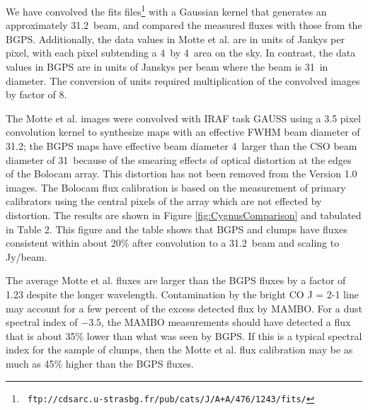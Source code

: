 \documentclass[12pt,preprint]{aastex}
\newcommand{\bcamfwhm}{31.2\arcsec}
\begin{document}
We have convolved the \citet{motte07} fits files\footnote{{\tt
ftp://cdsarc.u-strasbg.fr/pub/cats/J/A+A/476/1243/fits/}} with a Gaussian
kernel that generates an approximately \bcamfwhm\ beam, and compared the
measured fluxes with those from the BGPS.  Additionally, the data values
in Motte et al. are in units of Jankys per pixel, with each pixel subtending
a 4\arcsec\ by 4\arcsec\ area on the sky.  In contrast, the data values
in BGPS are in units of Janskys per beam where the beam is 31\arcsec\
in diameter.   The conversion of units required multiplication of the
convolved images by factor of 8.

The Motte et al. images were convolved with IRAF task
GAUSS using a 3.5 pixel convolution kernel to synthesize maps with an
effective FWHM beam diameter of \bcamfwhm ;  the BGPS maps have effective
beam diameter 4\arcsec\ larger than the CSO beam diameter of 31\arcsec\
because of the smearing effects of optical distortion at the edges of the
Bolocam array.  This distortion has not been removed from the Version 1.0
images.  The Bolocam flux calibration is based on the measurement of
primary calibrators using the central pixels of the array which are not
effected by distortion.   The results are shown  in Figure
\ref{fig:CygnusComparison} and tabulated in Table 2.  This figure and
the table shows that BGPS and \citet{motte07} clumps have fluxes
consistent within about 20\% after convolution to a \bcamfwhm\ beam and
scaling to Jy/beam.

The average Motte et al. fluxes are larger than the BGPS fluxes by a factor
of 1.23 despite the longer wavelength.  Contamination by the bright
CO J = 2-1 line may account for a few percent of the excess
detected flux by MAMBO.    For a dust spectral index of $-3.5$, the
MAMBO measurements should have detected a flux that is about 35\% lower
than what was seen by BGPS.    If this is a typical spectral index for
the sample of clumps, then the Motte et al. flux calibration may be as
much as 45\% higher than the BGPS fluxes.
\end{document}
